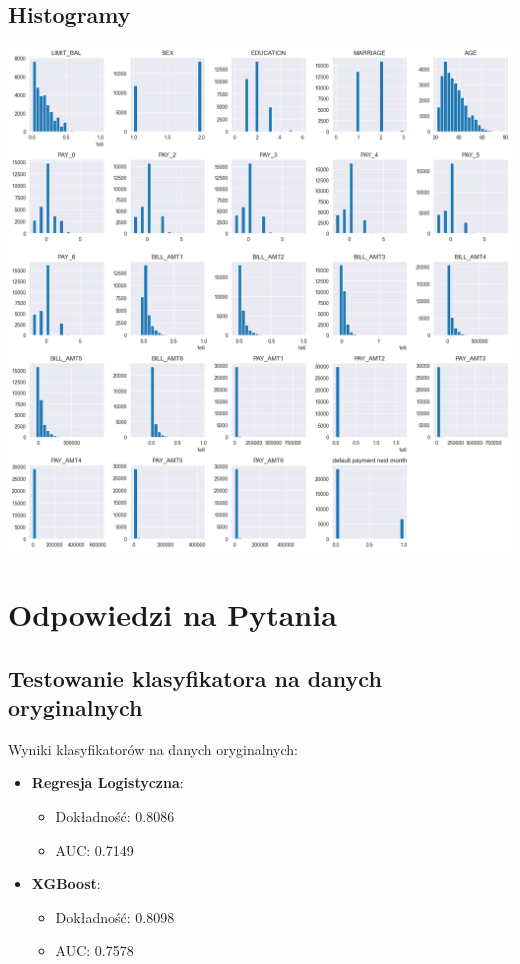 \documentclass{article}
\begin{document}
\subsection{Histogramy}
\includegraphics[width=1\textwidth]{./histogramy.png}

\section{Odpowiedzi na Pytania}

\subsection{Testowanie klasyfikatora na danych oryginalnych}

Wyniki klasyfikatorów na danych oryginalnych:

\begin{itemize}
    \item \textbf{Regresja Logistyczna}:
          \begin{itemize}
              \item Dokładność: 0.8086
              \item AUC: 0.7149
          \end{itemize}
    \item \textbf{XGBoost}:
          \begin{itemize}
              \item Dokładność: 0.8098
              \item AUC: 0.7578
          \end{itemize}
\end{itemize}
\end{document}
